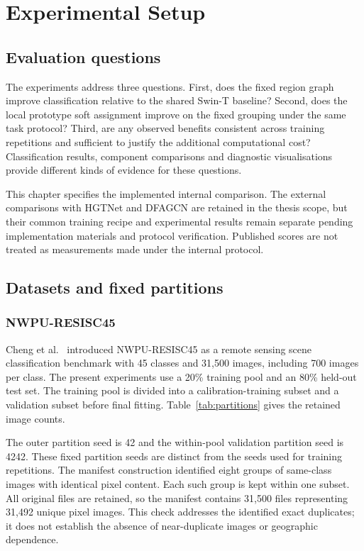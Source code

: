 \chapter{Experimental Setup}
\label{chap:setup}

\section{Evaluation questions}

The experiments address three questions. First, does the fixed region graph
improve classification relative to the shared Swin-T baseline? Second, does
the local prototype soft assignment improve on the fixed grouping under the
same task protocol? Third, are any observed benefits consistent across
training repetitions and sufficient to justify the additional computational
cost? Classification results, component comparisons and diagnostic
visualisations provide different kinds of evidence for these questions.

This chapter specifies the implemented internal comparison. The external
comparisons with HGTNet and DFAGCN are retained in the thesis scope, but their
common training recipe and experimental results remain separate pending
implementation materials and protocol verification. Published scores are
not treated as measurements made under the internal protocol.

\section{Datasets and fixed partitions}

\subsection{NWPU-RESISC45}

Cheng et al.~\cite{cheng2017nwpu} introduced NWPU-RESISC45 as a remote
sensing scene classification benchmark with 45 classes and 31,500 images,
including 700 images per class. The present experiments use a 20\% training
pool and an 80\% held-out test set. The training pool is divided into a
calibration-training subset and a validation subset before final fitting.
Table~\ref{tab:partitions} gives the retained image counts.

The outer partition seed is 42 and the within-pool validation partition seed
is 4242. These fixed partition seeds are distinct from the seeds used for
training repetitions. The manifest construction identified eight groups of
same-class images with identical pixel content. Each such group is kept
within one subset. All original files are retained, so the manifest contains
31,500 files representing 31,492 unique pixel images. This check addresses
the identified exact duplicates; it does not establish the absence of
near-duplicate images or geographic dependence.

